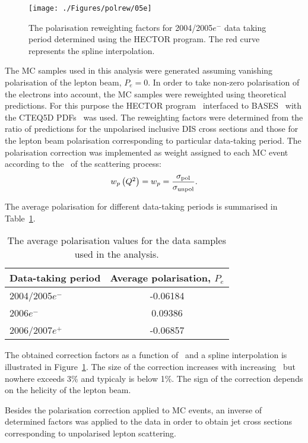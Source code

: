 \label{sec:polcor}
\begin{figure}[h]
 \begin{center}
 \texttt{[image: ./Figures/polrew/05e]}
\end{center}
\caption{The polarisation reweighting factors for 2004/2005$e^-$ data taking period determined using the HECTOR program. The red curve represents the spline interpolation.}
\label{fig:polcor05e}
\end{figure} 
The MC samples used in this analysis were generated assuming vanishing polarisation of the lepton beam, $P_e = 0$. In order to take non-zero polarisation of the electrons into account, the MC samples were reweighted using theoretical predictions. For this purpose the HECTOR program~\cite{HECTOR} interfaced to BASES~\cite{bases} with the CTEQ5D PDFs~\cite{CTEQ5} was used. The reweighting factors were determined from the ratio of predictions for the unpolarised inclusive DIS cross sections and those for the lepton beam polarisation corresponding to particular data-taking period. The polarisation correction was implemented as weight assigned to each MC event according to the \qsq~of the scattering process:
\begin{equation}
 w_p\left(\mbox{${Q^2}$}\right) = w_p = \frac{\sigma_\mathrm{pol}}{\sigma_\mathrm{unpol}}.
\end{equation}

The average polarisation for different data-taking periods is summarised in Table~\ref{tab:polvalues}.
\begin{table}[h]
 \centering
 \begin{tabular}{lc}
 Data-taking period & Average polarisation, $P_e$ \\
\hline
 2004/2005$e^-$   & -0.06184 \\
 2006$e^-$   & 0.09386  \\
 2006/2007$e^+$ & -0.06857
\end{tabular} 
\caption{The average polarisation values for the data samples used in the analysis.}
\label{tab:polvalues}
\end{table}
The obtained correction factors as a function of \qsq~and a spline interpolation is illustrated in Figure~\ref{fig:polcor05e}. The size of the correction increases with increasing \qsq~but nowhere exceeds 3\% and typicaly is below 1\%. The sign of the correction depends on the helicity of the lepton beam.

Besides the polarisation correction applied to MC events, an inverse of determined factors was applied to the data in order to obtain jet cross sections corresponding to unpolarised lepton scattering.